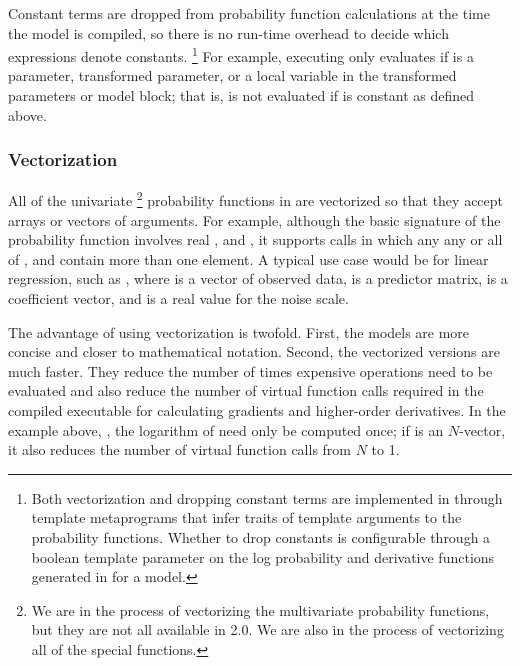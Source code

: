 \documentclass[article]{jss}
\begin{document}
Constant terms are dropped from probability function calculations at
the time the model is compiled, so there is no run-time overhead to
decide which expressions denote constants.%
%
\footnote{Both vectorization and dropping constant terms are
  implemented in  through template metaprograms that
  infer traits of template arguments to the probability functions.
  Whether to drop constants is configurable through a boolean template
  parameter on the log probability and derivative functions generated
  in  for a model.}
%
For example, executing  only evaluates
 if  is a parameter, transformed
parameter, or a local variable in the transformed parameters or model
block; that is,  is not evaluated if  is
constant as defined above.  

\subsubsection{Vectorization}

All of the univariate%
%
\footnote{We are in the process of vectorizing the multivariate
  probability functions, but they are not all available in
   2.0.  We are also in the process of vectorizing
  all of the special functions.}
%
probability functions in  are vectorized so that they
accept arrays or vectors of arguments.  For example, although the
basic signature of the probability function
 involves real ,  and
, it supports calls in which any any or all of ,
 and  contain more than one element. A typical
use case would be for linear regression, such as , where  is a vector of observed data,
 is a predictor matrix,  is a coefficient vector,
and  is a real value for the noise scale.

The advantage of using vectorization is twofold.  First, the models
are more concise and closer to mathematical notation.  Second, the
vectorized versions are much faster.  They reduce the number of times
expensive operations need to be evaluated and also reduce the number
of virtual function calls required in the compiled 
executable for calculating gradients and higher-order derivatives.
In the example above, , the logarithm of  need only be computed
once; if  is an $N$-vector, it also reduces the number of
virtual function calls from $N$ to 1.
\end{document}
